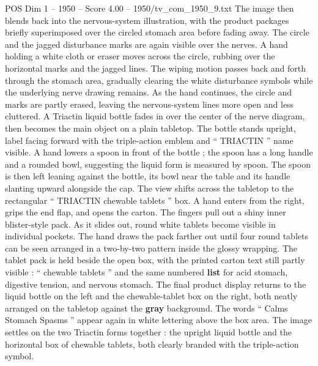 \begin{textsample}{POS Dim 1 – 1950 – Score 4.00 – 1950/tv\_com\_1950\_9.txt}
The image then blends back into the nervous-system illustration, with the product packages briefly superimposed over the circled stomach area before fading away.
The circle and the jagged disturbance marks are again visible over the nerves.
A hand holding a white cloth or eraser moves across the circle, rubbing over the horizontal marks and the jagged lines.
The wiping motion passes back and forth through the stomach area, gradually clearing the white disturbance symbols while the underlying nerve drawing remains.
As the hand continues, the circle and marks are partly erased, leaving the nervous-system lines more open and less cluttered.
A Triactin liquid bottle fades in over the center of the nerve diagram, then becomes the main object on a plain tabletop.
The bottle stands upright, label facing forward with the triple-action emblem and “ TRIACTIN ” name visible.
A hand lowers a spoon in front of the bottle ; the spoon has a long handle and a rounded bowl, suggesting the liquid form is measured by spoon.
The spoon is then left leaning against the bottle, its bowl near the table and its handle slanting upward alongside the cap.
The view shifts across the tabletop to the rectangular “ TRIACTIN chewable tablets ” box.
A hand enters from the right, grips the end flap, and opens the carton.
The fingers pull out a shiny inner blister-style pack.
As it slides out, round white tablets become visible in individual pockets.
The hand draws the pack farther out until four round tablets can be seen arranged in a two-by-two pattern inside the glossy wrapping.
The tablet pack is held beside the open box, with the printed carton text still partly visible : “ chewable tablets ” and the same numbered \textbf{list} for acid stomach, digestive tension, and nervous stomach.
The final product display returns to the liquid bottle on the left and the chewable-tablet box on the right, both neatly arranged on the tabletop against the \textbf{gray} background.
The words “ Calms Stomach Spasms ” appear again in white lettering above the box area.
The image settles on the two Triactin forms together : the upright liquid bottle and the horizontal box of chewable tablets, both clearly branded with the triple-action symbol.

\end{textsample}

